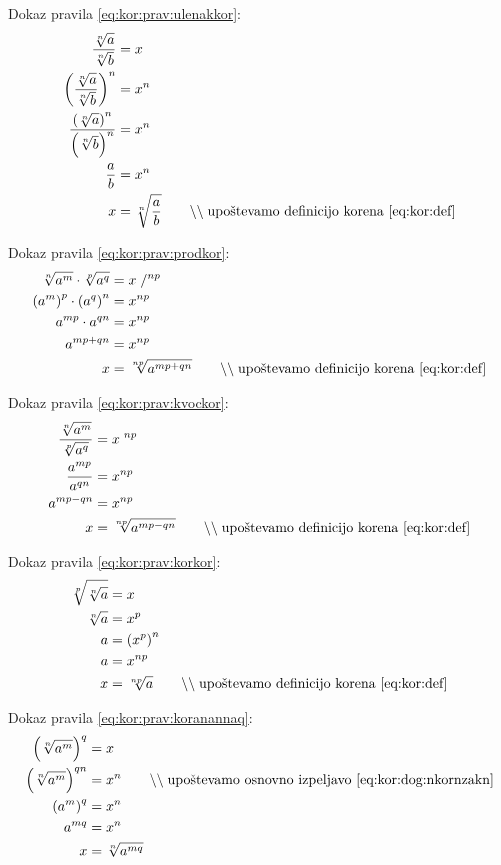 \documentclass[a4paper,oneside,12pt,fleqn]{article}
\newcommand\krat\cdot
\newcommand{\comment}[1]{\ensuremath{\qquad\backslash\backslash\;}\textnormal{#1}}
\numberwithin{equation}{section}
\begin{document}
Dokaz pravila \ref{eq:kor:prav:ulenakkor}:
\begin{align*}
  \frac{\sqrt[n]{a}}{\sqrt[n]{b}} &= x \\
  \left( \frac{\sqrt[n]{a}}{\sqrt[n]{b}} \right)^n &= x^n \\
  \frac{\left( \sqrt[n]{a} \right)^n}{\left( \sqrt[n]{b} \right)^n} &= x^n \\
  \frac{a}{b} &= x^n \\
  x &= \sqrt[n]{\frac{a}{b}} \comment{upoštevamo definicijo korena \eqref{eq:kor:def}}
\end{align*}

Dokaz pravila \ref{eq:kor:prav:prodkor}:
\begin{align*}
  \sqrt[n]{a^m} \krat \sqrt[p]{a^q} &= x \;/^{np} \\
  \left( a^m \right)^p \krat \left( a^q \right)^n &= x^{np} \\
  a^{mp} \krat a^{qn} &= x^{np} \\
  a^{mp + qn} &= x^{np} \\
  x &= \sqrt[np]{a^{mp+qn}} \comment{upoštevamo definicijo korena \eqref{eq:kor:def}}
\end{align*}

Dokaz pravila \ref{eq:kor:prav:kvockor}:
\begin{align*}
  \frac{\sqrt[n]{a^m}}{\sqrt[p]{a^q}} &= x \; ^{np} \\
  \frac{a^{mp}}{a^{qn}} &= x^{np} \\
  a^{mp-qn} &= x^{np} \\
  x &= \sqrt[np]{a^{mp-qn}} \comment{upoštevamo definicijo korena \eqref{eq:kor:def}}
\end{align*}

Dokaz pravila \ref{eq:kor:prav:korkor}:
\begin{align*}
   \sqrt[p]{\sqrt[n]{a}} &= x \\
   \sqrt[n]{a} &= x^p \\
   a &= \left( x^p \right)^n \\
   a &= x^{np} \\
   x &= \sqrt[np]{a} \comment{upoštevamo definicijo korena \eqref{eq:kor:def}}
\end{align*}

Dokaz pravila \ref{eq:kor:prav:koranannaq}:
\begin{align*}
  \left( \sqrt[n]{a^m} \right)^q &= x \\
  \left( \sqrt[n]{a^m} \right)^{qn} &= x^n \comment{upoštevamo osnovno izpeljavo \eqref{eq:kor:dog:nkornzakn}} \\
  \left( a^m \right)^q &= x^n \\
  a^{mq} &= x^n \\
  x &= \sqrt[n]{a^{mq}}
\end{align*}
\end{document}

